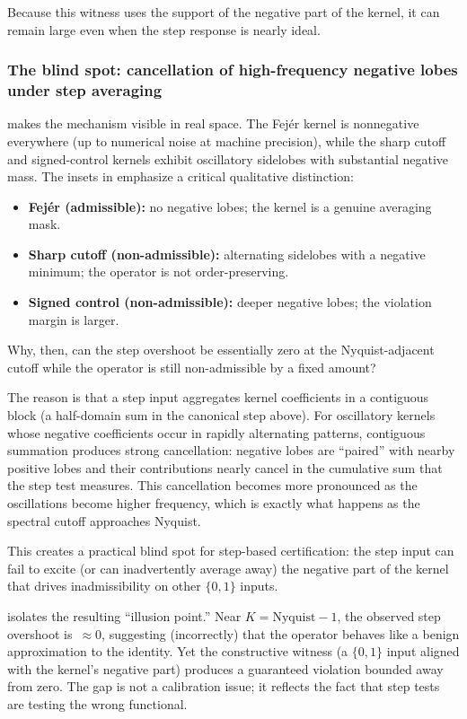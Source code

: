 \documentclass[11pt,a4paper]{article}
\theoremstyle{plain}
\theoremstyle{definition}
\theoremstyle{plain}
\begin{document}
Because this witness uses the support of the negative part of the kernel, it can
remain large even when the step response is nearly ideal.


\subsubsection{The blind spot: cancellation of high-frequency negative lobes
  under step averaging}

 makes the mechanism visible in real space.  The
Fej\'er kernel is nonnegative everywhere (up to numerical noise at machine
precision), while the sharp cutoff and signed-control kernels exhibit oscillatory
sidelobes with substantial negative mass.  The insets in
 emphasize a critical qualitative distinction:

\begin{itemize}[leftmargin=2em]
  \item \textbf{Fej\'er (admissible):} no negative lobes; the kernel is a
    genuine averaging mask.
  \item \textbf{Sharp cutoff (non-admissible):} alternating sidelobes with a
    negative minimum; the operator is not order-preserving.
  \item \textbf{Signed control (non-admissible):} deeper negative lobes; the
    violation margin is larger.
\end{itemize}

Why, then, can the step overshoot be essentially zero at the Nyquist-adjacent
cutoff while the operator is still non-admissible by a fixed amount?

The reason is that a step input aggregates kernel coefficients in a contiguous
block (a half-domain sum in the canonical step above).  For oscillatory kernels
whose negative coefficients occur in rapidly alternating patterns, contiguous
summation produces strong cancellation: negative lobes are ``paired'' with nearby
positive lobes and their contributions nearly cancel in the cumulative sum that
the step test measures.  This cancellation becomes more pronounced as the
oscillations become higher frequency, which is exactly what happens as the
spectral cutoff approaches Nyquist.

This creates a practical blind spot for step-based certification: the step input
can fail to excite (or can inadvertently average away) the negative part of the
kernel that drives inadmissibility on other $\{0,1\}$ inputs.

 isolates the resulting ``illusion point.''  Near
$K = \mathrm{Nyquist}-1$, the observed step overshoot is~$\approx 0$, suggesting
(incorrectly) that the operator behaves like a benign approximation to the
identity.  Yet the constructive witness (a $\{0,1\}$ input aligned with the
kernel's negative part) produces a guaranteed violation bounded away from zero.
The gap is not a calibration issue; it reflects the fact that step tests are
testing the wrong functional.
\end{document}
